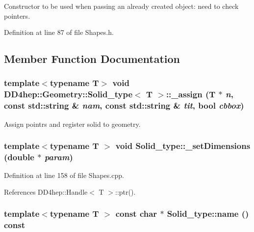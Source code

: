 Constructor to be used when passing an already created object: need to check pointers. 

Definition at line 87 of file Shapes.h.

\subsection{Member Function Documentation}
\hypertarget{class_d_d4hep_1_1_geometry_1_1_solid__type_aada9040dac58ebc0dcd7562ff99ce600}{
\subsubsection[{\_\-assign}]{\setlength{\rightskip}{0pt plus 5cm}template$<$typename T$>$ void {\bf DD4hep::Geometry::Solid\_\-type}$<$ {\bf T} $>$::\_\-assign ({\bf T} $\ast$ {\em n}, \/  const std::string \& {\em nam}, \/  const std::string \& {\em tit}, \/  bool {\em cbbox})}}
\label{class_d_d4hep_1_1_geometry_1_1_solid__type_aada9040dac58ebc0dcd7562ff99ce600}


Assign pointrs and register solid to geometry. \hypertarget{class_d_d4hep_1_1_geometry_1_1_solid__type_a1a3a86774632f79e32518a7c77ad1fe8}{
\subsubsection[{\_\-setDimensions}]{\setlength{\rightskip}{0pt plus 5cm}template$<$typename T $>$ void Solid\_\-type::\_\-setDimensions (double $\ast$ {\em param})}}
\label{class_d_d4hep_1_1_geometry_1_1_solid__type_a1a3a86774632f79e32518a7c77ad1fe8}


Definition at line 158 of file Shapes.cpp.

References DD4hep::Handle$<$ T $>$::ptr().\hypertarget{class_d_d4hep_1_1_geometry_1_1_solid__type_a2e1c12b2d84add0bc77ced60600339aa}{
\subsubsection[{name}]{\setlength{\rightskip}{0pt plus 5cm}template$<$typename T $>$ const char $\ast$ Solid\_\-type::name () const}}
\label{class_d_d4hep_1_1_geometry_1_1_solid__type_a2e1c12b2d84add0bc77ced60600339aa}


